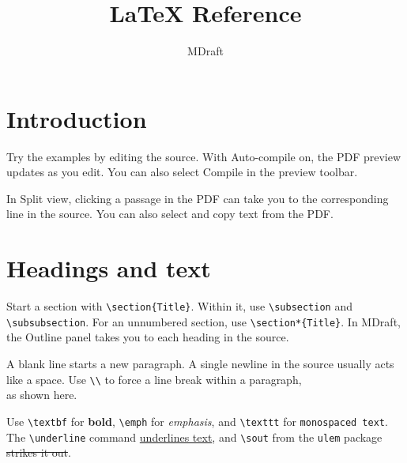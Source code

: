 \documentclass[11pt]{article}
\title{LaTeX Reference}
\author{MDraft}
\date{}
\begin{document}
\maketitle

\section{Introduction}

Try the examples by editing the source. With \textsf{Auto-compile} on, the PDF preview updates as you edit. You can also select \textsf{Compile} in the preview toolbar.

In Split view, clicking a passage in the PDF can take you to the corresponding line in the source. You can also select and copy text from the PDF.

\tableofcontents

\section{Headings and text}

Start a section with \verb|\section{Title}|. Within it, use \verb|\subsection| and \verb|\subsubsection|. For an unnumbered section, use \verb|\section*{Title}|. In MDraft, the Outline panel takes you to each heading in the source.

A blank line starts a new paragraph.
A single newline in the source usually acts like a space.
Use \verb|\\| to force a line break within a paragraph,\\
as shown here.

Use \verb|\textbf| for \textbf{bold}, \verb|\emph| for \emph{emphasis}, and \verb|\texttt| for \texttt{monospaced text}. The \verb|\underline| command \underline{underlines text}, and \verb|\sout| from the \verb|ulem| package \sout{strikes it out}.
\end{document}
